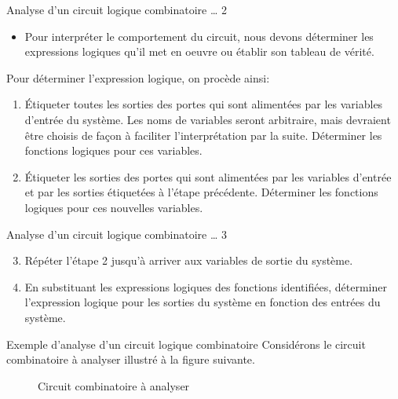 \documentclass[presentation]{beamer}
\begin{document}
\begin{frame}[label={sec:orgb7aa8f4}]{Analyse d'un circuit logique combinatoire \ldots{} 2}
\begin{itemize}
\item Pour interpréter le comportement du circuit, nous devons déterminer les expressions logiques qu'il met en oeuvre ou établir son tableau de vérité.
\end{itemize}


Pour déterminer l'expression logique, on procède ainsi:
\begin{enumerate}
\item Étiqueter toutes les sorties des portes qui sont alimentées par les
variables d'entrée du système. Les noms de variables seront
arbitraire, mais devraient être choisis de façon à faciliter
l'interprétation par la suite. Déterminer les fonctions logiques
pour ces variables.
\item Étiqueter les sorties des portes qui sont alimentées par les
variables d'entrée et par les sorties étiquetées à l'étape
précédente. Déterminer les fonctions logiques pour ces nouvelles
variables.
\end{enumerate}
\end{frame}

\begin{frame}[label={sec:orgfa6ff7b}]{Analyse d'un circuit logique combinatoire \ldots{} 3}
\begin{enumerate}
\setcounter{enumi}{2}
\item Répéter l'étape 2 jusqu'à arriver aux variables de sortie du système.
\item En substituant les expressions logiques des fonctions identifiées,
déterminer l'expression logique pour les sorties du système en
fonction des entrées du système.
\end{enumerate}
\end{frame}

\begin{frame}[label={sec:orge16230e}]{Exemple d'analyse d'un circuit logique combinatoire}
Considérons le circuit combinatoire à analyser illustré à la figure
suivante.

\begin{figure}[htbp]
\centering

\caption{\label{fig:org46d24a0}Circuit combinatoire à analyser}
\end{figure}
\end{frame}
\end{document}
